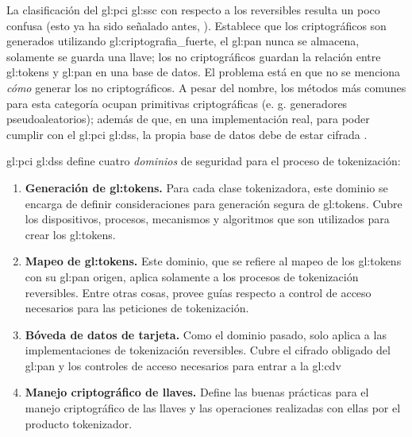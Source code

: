 

La clasificación del \gls{gl:pci} \gls{gl:ssc} con respecto a los reversibles
resulta un poco confusa (esto ya ha sido señalado antes, \cite{doc_sandra}).
Establece que los criptográficos son generados utilizando
\gls{gl:criptografia_fuerte}, el \gls{gl:pan} nunca se almacena, solamente se
guarda una llave; los no criptográficos guardan la relación entre
\glspl{gl:token} y \gls{gl:pan} en una base de datos. El problema está en que
no se menciona \textit{cómo} generar los no criptográficos. A pesar del nombre,
los métodos más comunes para esta categoría ocupan primitivas criptográficas
(e. g. generadores pseudoaleatorios); además de que, en una implementación
real, para poder cumplir con el \gls{gl:pci} \gls{gl:dss}, la propia base de
datos debe de estar cifrada \cite{pci_dss}.

\gls{gl:pci} \gls{gl:dss} define cuatro \textit{dominios} de seguridad para el
proceso de tokenización:
\begin{enumerate}
  \item \textbf{Generación de \glspl{gl:token}.} 
    Para cada clase tokenizadora, este dominio se encarga de definir 
    consideraciones para generación segura de \glspl{gl:token}. Cubre los
    dispositivos, procesos, mecanismos y algoritmos que son utilizados para
    crear los \glspl{gl:token}.
  \item \textbf{Mapeo de \glspl{gl:token}.}
    Este dominio, que se refiere al mapeo de los \glspl{gl:token} con su 
    \gls{gl:pan} origen, aplica solamente a los procesos de tokenización 
    reversibles. Entre otras cosas, provee guías respecto a control de acceso
    necesarios para las peticiones de tokenización.
  \item \textbf{Bóveda de datos de tarjeta.}
    Como el dominio pasado, solo aplica a las implementaciones de tokenización 
    reversibles. Cubre el cifrado obligado del \gls{gl:pan} y los controles de 
    acceso necesarios para entrar a la \gls{gl:cdv}
  \item \textbf{Manejo criptográfico de llaves.}
    Define las buenas prácticas para el manejo criptográfico de las llaves y 
    las operaciones realizadas con ellas por el producto tokenizador.
\end{enumerate}





